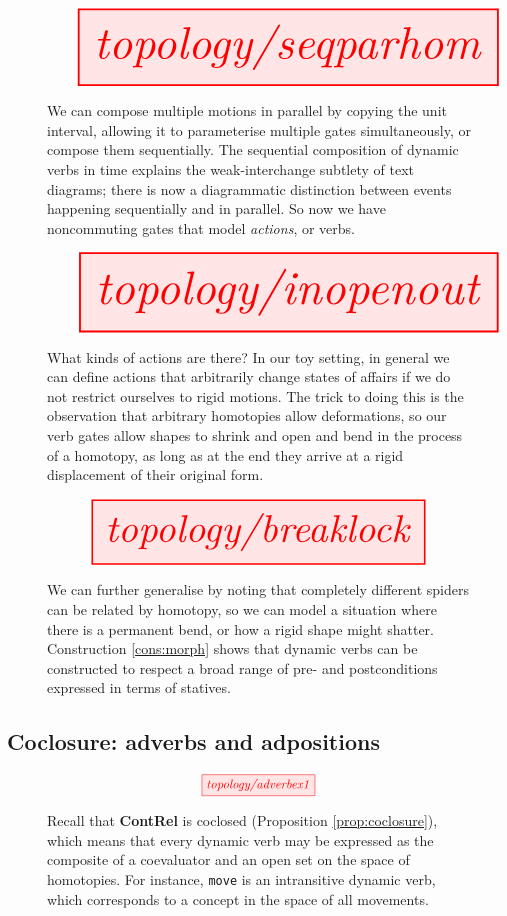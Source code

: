 \begin{figure}
\[\resizebox{\textwidth}{!}{\tikzfig{topology/seqparhom}}\]
\caption{
We can compose multiple motions in parallel by copying the unit interval, allowing it to parameterise multiple gates simultaneously, or compose them sequentially. The sequential composition of dynamic verbs in time explains the weak-interchange subtlety of text diagrams; there is now a diagrammatic distinction between events happening sequentially and in parallel. So now we have noncommuting gates that model \emph{actions}, or verbs.
}
\end{figure}

\begin{figure}[h!]
\[\resizebox{\textwidth}{!}{\tikzfig{topology/inopenout}}\]
\caption{What kinds of actions are there? In our toy setting, in general we can define actions that arbitrarily change states of affairs if we do not restrict ourselves to rigid motions. The trick to doing this is the observation that arbitrary homotopies allow deformations, so our verb gates allow shapes to shrink and open and bend in the process of a homotopy, as long as at the end they arrive at a rigid displacement of their original form.}
\end{figure}

\begin{figure}[h!]
\[\resizebox{0.8\textwidth}{!}{\tikzfig{topology/breaklock}}\]
\caption{
We can further generalise by noting that completely different spiders can be related by homotopy, so we can model a situation where there is a permanent bend, or how a rigid shape might shatter. Construction \ref{cons:morph} shows that dynamic verbs can be constructed to respect a broad range of pre- and postconditions expressed in terms of statives.
}
\end{figure}

\clearpage

\subsection{Coclosure: adverbs and adpositions}

\begin{figure}[h!]
\[\scalebox{0.9}{\tikzfig{topology/adverbex1}}\]
\caption{
Recall that \textbf{ContRel} is coclosed (Proposition \ref{prop:coclosure}), which means that every dynamic verb may be expressed as the composite of a coevaluator and an open set on the space of homotopies. For instance, \texttt{move} is an intransitive dynamic verb, which corresponds to a concept in the space of all movements.
}
\end{figure}

